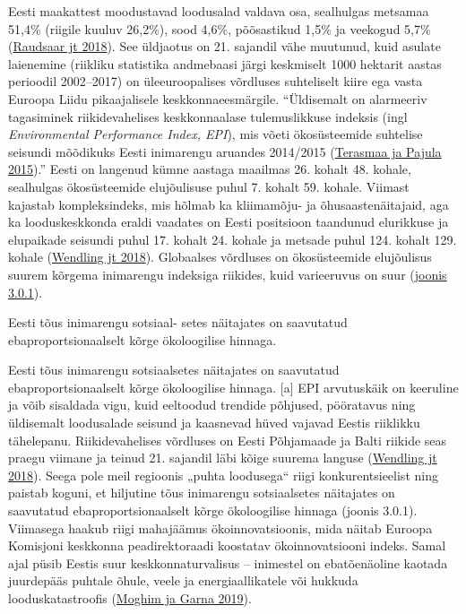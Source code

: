 \documentclass[estonian,]{article}
\begin{document}
Eesti maakattest moodustavad loodusalad valdava osa, sealhulgas metsamaa 51,4\% (riigile kuuluv 26,2\%), sood 4,6\%, põõsastikud 1,5\% ja veekogud 5,7\% (\protect\hyperlink{Raudsaar2018}{Raudsaar jt 2018}). See üldjaotus on 21. sajandil vähe muutunud, kuid asulate laienemine (riikliku statistika andmebaasi järgi keskmiselt 1000 hektarit aastas perioodil 2002--2017) on üleeuroopalises võrdluses suhteliselt kiire ega vasta Euroopa Liidu pikaajalisele keskkonnaeesmärgile. ``Üldisemalt on alarmeeriv tagasiminek riikidevahelises keskkonnaalase tulemuslikkuse indeksis (ingl \emph{Environmental Performance Index, EPI}), mis võeti ökosüsteemide suhtelise seisundi mõõdikuks Eesti inimarengu aruandes 2014/2015 (\protect\hyperlink{Terasmaa2015}{Terasmaa ja Pajula 2015}).'' Eesti on langenud kümne aastaga maailmas 26. kohalt 48. kohale, sealhulgas ökosüsteemide elujõulisuse puhul 7. kohalt 59. kohale. Viimast kajastab kompleksindeks, mis hõlmab ka kliimamõju- ja õhusaastenäitajaid, aga ka looduskeskkonda eraldi vaadates on Eesti positsioon taandunud elurikkuse ja elupaikade seisundi puhul 17. kohalt 24. kohale ja metsade puhul 124. kohalt 129. kohale (\protect\hyperlink{Wendling2018}{Wendling jt 2018}). Globaalses võrdluses on ökosüsteemide elujõulisus suurem kõrgema inimarengu indeksiga riikides, kuid varieeruvus on suur (\protect\hyperlink{figure301}{joonis 3.0.1}).

\begin{blockquote-right}
Eesti tõus inimarengu sotsiaal- setes näitajates on saavutatud
ebaproportsionaalselt kõrge ökoloogilise hinnaga.
\end{blockquote-right}

Eesti tõus inimarengu sotsiaalsetes näitajates on saavutatud ebaproportsionaalselt kõrge ökoloogilise hinnaga. {[}a{]}
EPI arvutuskäik on keeruline ja võib sisaldada vigu, kuid eeltoodud trendide põhjused, pööratavus ning üldisemalt loodusalade seisund ja kaasnevad hüved vajavad Eestis riiklikku tähelepanu. Riikidevahelises võrdluses on Eesti Põhjamaade ja Balti riikide seas praegu viimane ja teinud 21. sajandil läbi kõige suurema languse (\protect\hyperlink{Wendling2018}{Wendling jt 2018}). Seega pole meil regioonis „puhta loodusega`` riigi konkurentsieelist ning paistab koguni, et hiljutine tõus inimarengu sotsiaalsetes näitajates on saavutatud ebaproportsionaalselt kõrge ökoloogilise hinnaga (joonis 3.0.1). Viimasega haakub riigi mahajäämus ökoinnovatsioonis, mida näitab Euroopa Komisjoni keskkonna peadirektoraadi koostatav ökoinnovatsiooni indeks. Samal ajal püsib Eestis suur keskkonnaturvalisus -- inimestel on ebatõenäoline kaotada juurdepääs puhtale õhule, veele ja energiaallikatele või hukkuda looduskatastroofis (\protect\hyperlink{Moghim2019}{Moghim ja Garna 2019}).
\end{document}
